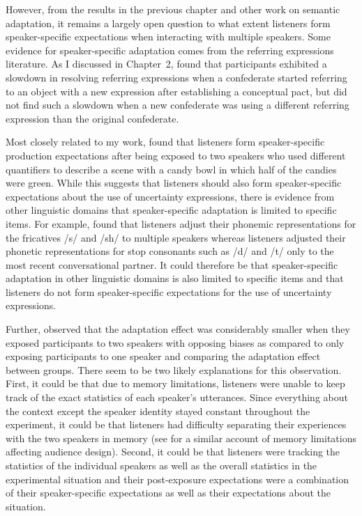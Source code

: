 However, from the results in the previous chapter and other work on semantic adaptation, 
it remains a largely open question to what extent listeners form speaker-specific
expectations when interacting with multiple speakers. Some evidence for speaker-specific
adaptation comes from the referring expressions literature. As I discussed in Chapter~2,  \textcite{Metzing2003} found that 
participants exhibited a slowdown in resolving referring expressions
when a confederate started referring to an object with a new expression 
after establishing a conceptual pact, but did not find such a slowdown 
when a new confederate was using a different referring expression 
than the original confederate. 

Most closely related to my work, \textcite{Yildirim2016} found that listeners 
form speaker-specific production expectations after being exposed to 
two speakers who used different 
quantifiers to describe a scene with a candy bowl
in which half of the candies were green. While this suggests
that listeners should also form speaker-specific expectations
about the use of uncertainty expressions, there is evidence from
other linguistic domains that speaker-specific adaptation is limited to specific items.
For example, \textcite{Kraljic2007} found that listeners adjust their phonemic
representations for the fricatives /s/ and /sh/ to multiple speakers whereas listeners
adjusted their phonetic representations for stop consonants such as /d/ and /t/ only
to the most recent conversational partner. It could therefore be that speaker-specific adaptation
in other linguistic domains is also limited to specific items and that listeners do not
form speaker-specific expectations for the use of uncertainty expressions.

Further, \textcite{Yildirim2016} observed that the adaptation effect was considerably smaller
when they exposed participants to two speakers with opposing biases as compared 
to only exposing participants to one speaker and comparing the adaptation 
effect between groups. There seem to be two likely explanations for this observation.
First, it could be that due to memory limitations, listeners were unable 
to keep track of the exact statistics of each speaker's utterances. Since
everything about the context except the speaker identity stayed constant
throughout the experiment, it could be that listeners had difficulty 
separating their experiences with the two speakers in memory (see \textcite{Horton2005} for 
a similar account of memory limitations affecting audience design). Second, it
could be that listeners were tracking the statistics of the individual speakers as
well as the overall statistics in the experimental situation and their post-exposure
expectations were a combination of their speaker-specific expectations as well as 
their expectations about the situation.


